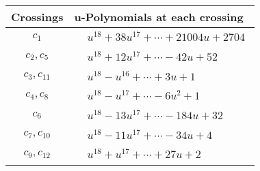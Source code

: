 \documentclass[1p]{elsarticle_modified}
\theoremstyle{definition}
\begin{document}
\begin{tabular}{m{50pt}|m{274pt}}
Crossings & \hspace{64pt}u-Polynomials at each crossing \\
\hline $$\begin{aligned}c_{1}\end{aligned}$$&$\begin{aligned}
&u^{18}+38 u^{17}+\cdots+21004 u+2704
\end{aligned}$\\
\hline $$\begin{aligned}c_{2},c_{5}\end{aligned}$$&$\begin{aligned}
&u^{18}+12 u^{17}+\cdots-42 u+52
\end{aligned}$\\
\hline $$\begin{aligned}c_{3},c_{11}\end{aligned}$$&$\begin{aligned}
&u^{18}- u^{16}+\cdots+3 u+1
\end{aligned}$\\
\hline $$\begin{aligned}c_{4},c_{8}\end{aligned}$$&$\begin{aligned}
&u^{18}- u^{17}+\cdots-6 u^2+1
\end{aligned}$\\
\hline $$\begin{aligned}c_{6}\end{aligned}$$&$\begin{aligned}
&u^{18}-13 u^{17}+\cdots-184 u+32
\end{aligned}$\\
\hline $$\begin{aligned}c_{7},c_{10}\end{aligned}$$&$\begin{aligned}
&u^{18}-11 u^{17}+\cdots-34 u+4
\end{aligned}$\\
\hline $$\begin{aligned}c_{9},c_{12}\end{aligned}$$&$\begin{aligned}
&u^{18}+u^{17}+\cdots+27 u+2
\end{aligned}$\\
\hline
\end{tabular}\\~\\
\newpage\renewcommand{\arraystretch}{1}
\end{document}
